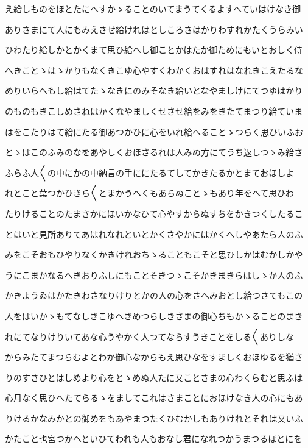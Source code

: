 \documentclass[a4paper,11pt,landscape]{ltjtarticle}
\begin{document}
え給しものをほとたにへすかゝることのいてまうてくるよすへていはけなき御
\par\medskip
ありさまにて人にもみえさせ給けれはとしころさはかりわすれかたくうらみい
\par\medskip
ひわたり給しかとかくまて思ひ給へし御ことかはたか御ためにもいとおしく侍
\par\medskip
へきことゝはゝかりもなくきこゆ心やすくわかくおはすれはなれきこえたるな
\par\medskip
めりいらへもし給はてたゝなきにのみそなき給いとなやましけにてつゆはかり
\par\medskip
のものもきこしめさねはかくなやましくせさせ給をみをきたてまつり給ていま
\par\medskip
はをこたりはて給にたる御あつかひに心をいれ給へることゝつらく思ひいふお
\par\medskip
とゝはこのふみのなをあやしくおほさるれは人みぬ方にてうち返しつゝみ給さ
\par\medskip
ふらふ人〱の中にかの中納言の手ににたるてしてかきたるかとまておほしよ
\par\medskip
れとこと葉つかひきら〱とまかうへくもあらぬことゝもあり年をへて思ひわ
\par\medskip
たりけることのたまさかにほいかなひて心やすからぬすちをかきつくしたるこ
\par\medskip
とはいと見所ありてあはれなれといとかくさやかにはかくへしやあたら人のふ
\par\medskip
みをこそおもひやりなくかきけれおちゝることもこそと思ひしかはむかしかや
\par\medskip
うにこまかなるへきおりふしにもことそきつゝこそかきまきらはしゝか人のふ
\par\medskip
かきようゐはかたきわさなりけりとかの人の心をさへみおとし給つさてもこの
\par\medskip
人をはいかゝもてなしきこゆへきめつらしきさまの御心ちもかゝることのまき
\par\medskip
れにてなりけりいてあな心うやかく人つてならすうきことをしる〱ありしな
\par\medskip
からみたてまつらむよとわか御心なからもえ思ひなをすましくおほゆるを猶さ
\par\medskip
りのすさひとはしめより心をとゝめぬ人たに又ことさまの心わくらむと思ふは
\par\medskip
心月なく思ひへたてらるゝをましてこれはさまことにおほけなき人の心にもあ
\par\medskip
りけるかなみかとの御めをもあやまつたくひむかしもありけれとそれは又いふ
\par\medskip
かたこと也宮つかへといひてわれも人もおなし君になれつかうまつるほとにを
\end{document}
